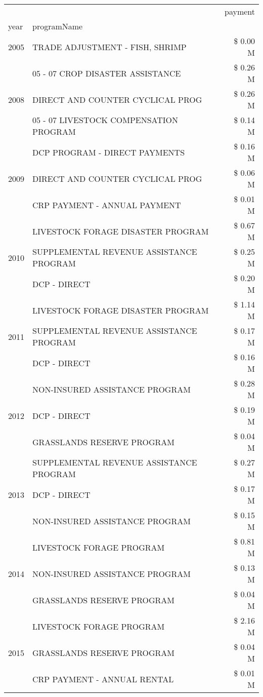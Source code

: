 \begin{tabular}{llr}
\toprule
 &  & payment \\
year & programName &  \\
\midrule
2005 & TRADE ADJUSTMENT - FISH, SHRIMP & \$ 0.00 M \\
\cline{1-3}
\multirow[t]{3}{*}{2008} & 05 - 07 CROP DISASTER ASSISTANCE & \$ 0.26 M \\
 & DIRECT AND COUNTER CYCLICAL PROG & \$ 0.26 M \\
 & 05 - 07 LIVESTOCK COMPENSATION PROGRAM & \$ 0.14 M \\
\cline{1-3}
\multirow[t]{3}{*}{2009} & DCP PROGRAM - DIRECT PAYMENTS & \$ 0.16 M \\
 & DIRECT AND COUNTER CYCLICAL PROG & \$ 0.06 M \\
 & CRP PAYMENT - ANNUAL PAYMENT & \$ 0.01 M \\
\cline{1-3}
\multirow[t]{3}{*}{2010} & LIVESTOCK FORAGE DISASTER PROGRAM & \$ 0.67 M \\
 & SUPPLEMENTAL REVENUE ASSISTANCE PROGRAM & \$ 0.25 M \\
 & DCP - DIRECT & \$ 0.20 M \\
\cline{1-3}
\multirow[t]{3}{*}{2011} & LIVESTOCK FORAGE DISASTER PROGRAM & \$ 1.14 M \\
 & SUPPLEMENTAL REVENUE ASSISTANCE PROGRAM & \$ 0.17 M \\
 & DCP - DIRECT & \$ 0.16 M \\
\cline{1-3}
\multirow[t]{3}{*}{2012} & NON-INSURED ASSISTANCE PROGRAM & \$ 0.28 M \\
 & DCP - DIRECT & \$ 0.19 M \\
 & GRASSLANDS RESERVE PROGRAM & \$ 0.04 M \\
\cline{1-3}
\multirow[t]{3}{*}{2013} & SUPPLEMENTAL REVENUE ASSISTANCE PROGRAM & \$ 0.27 M \\
 & DCP - DIRECT & \$ 0.17 M \\
 & NON-INSURED ASSISTANCE PROGRAM & \$ 0.15 M \\
\cline{1-3}
\multirow[t]{3}{*}{2014} & LIVESTOCK FORAGE PROGRAM & \$ 0.81 M \\
 & NON-INSURED ASSISTANCE PROGRAM & \$ 0.13 M \\
 & GRASSLANDS RESERVE PROGRAM & \$ 0.04 M \\
\cline{1-3}
\multirow[t]{3}{*}{2015} & LIVESTOCK FORAGE PROGRAM & \$ 2.16 M \\
 & GRASSLANDS RESERVE PROGRAM & \$ 0.04 M \\
 & CRP PAYMENT - ANNUAL RENTAL & \$ 0.01 M \\

\end{tabular}
